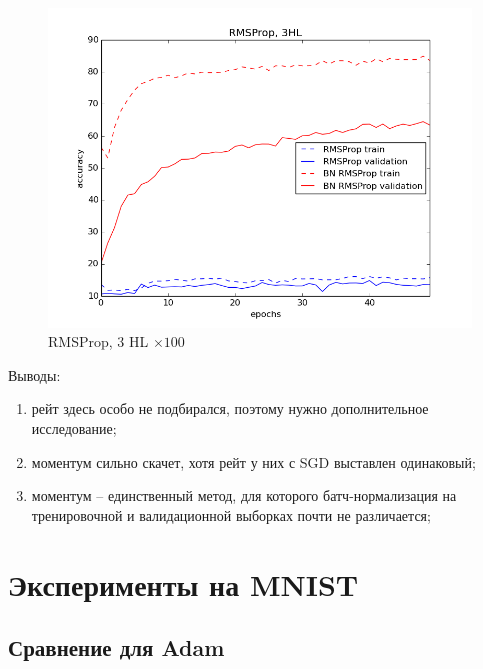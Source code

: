 \documentclass[12pt,oneside]{article}
\begin{document}
\begin{figure}[h!]
\begin{minipage}{0.45\textwidth}
\includegraphics[scale=0.38]{images/clRmsprop.png}
\caption{\small RMSProp, $3$ HL $\times 100$}
\end{minipage}
\end{figure}

\newpage

Выводы:

\begin{enumerate}
\item рейт здесь особо не подбирался, поэтому нужно дополнительное исследование;
\item моментум сильно скачет, хотя рейт у них с SGD выставлен одинаковый;
\item моментум -- единственный метод, для которого батч-нормализация на тренировочной и валидационной выборках почти не различается;
\end{enumerate}

\newpage

\section{Эксперименты на MNIST}

\subsection{Сравнение для Adam}
\end{document}
